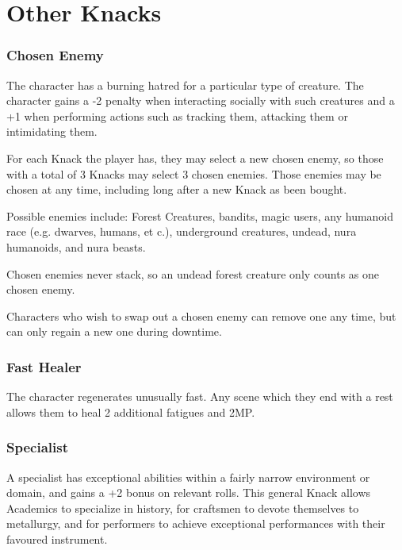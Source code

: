 \section{Other Knacks}

\begin{multicols}{2}

\subsubsection{Chosen Enemy}

The character has a burning hatred for a particular type of creature.
The character gains a -2 penalty when interacting socially with such creatures and a +1 when performing actions such as tracking them, attacking them or intimidating them.

For each Knack the player has, they may select a new chosen enemy, so those with a total of 3 Knacks may select 3 chosen enemies. Those enemies may be chosen at any time, including long after a new Knack as been bought.

Possible enemies include: Forest Creatures, bandits, magic users, any humanoid race (e.g. dwarves, humans, et c.), underground creatures, %
undead, nura humanoids, and nura beasts.%

Chosen enemies never stack, so an undead forest creature only counts as one chosen enemy.

Characters who wish to swap out a chosen enemy can remove one any time, but can only regain a new one during \gls{downtime}.

\subsubsection{Fast Healer}

The character regenerates unusually fast.
Any scene which they end with a rest allows them to heal 2 additional \glspl{fatigue} and 2MP.

\subsubsection{Specialist}
\label{specialist}

A specialist has exceptional abilities within a fairly narrow environment or domain, and gains a +2 bonus on relevant rolls.
This general Knack allows Academics to specialize in history, for craftsmen to devote themselves to metallurgy, and for performers to achieve exceptional performances with their favoured instrument.


\end{multicols}
